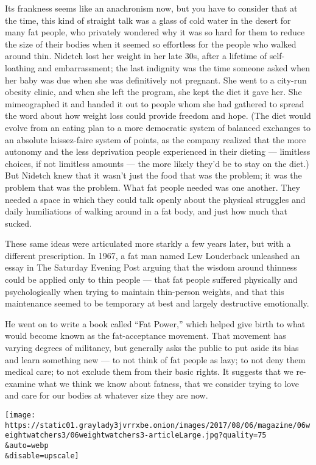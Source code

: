 Its frankness seems like an anachronism now, but you have to consider
that at the time, this kind of straight talk was a glass of cold water
in the desert for many fat people, who privately wondered why it was so
hard for them to reduce the size of their bodies when it seemed so
effortless for the people who walked around thin. Nidetch lost her
weight in her late 30s, after a lifetime of self-loathing and
embarrassment; the last indignity was the time someone asked when her
baby was due when she was definitively not pregnant. She went to a
city-run obesity clinic, and when she left the program, she kept the
diet it gave her. She mimeographed it and handed it out to people whom
she had gathered to spread the word about how weight loss could provide
freedom and hope. (The diet would evolve from an eating plan to a more
democratic system of balanced exchanges to an absolute laissez-faire
system of points, as the company realized that the more autonomy and the
less deprivation people experienced in their dieting --- limitless
choices, if not limitless amounts --- the more likely they'd be to stay
on the diet.) But Nidetch knew that it wasn't just the food that was the
problem; it was the problem that was the problem. What fat people needed
was one another. They needed a space in which they could talk openly
about the physical struggles and daily humiliations of walking around in
a fat body, and just how much that sucked.

These same ideas were articulated more starkly a few years later, but
with a different prescription. In 1967, a fat man named Lew Louderback
unleashed an essay in The Saturday Evening Post arguing that the wisdom
around thinness could be applied only to thin people --- that fat people
suffered physically and psychologically when trying to maintain
thin-person weights, and that this maintenance seemed to be temporary at
best and largely destructive emotionally.

He went on to write a book called ``Fat Power,'' which helped give birth
to what would become known as the fat-acceptance movement. That movement
has varying degrees of militancy, but generally asks the public to put
aside its bias and learn something new --- to not think of fat people as
lazy; to not deny them medical care; to not exclude them from their
basic rights. It suggests that we re-examine what we think we know about
fatness, that we consider trying to love and care for our bodies at
whatever size they are now.

\texttt{[image: https://static01.graylady3jvrrxbe.onion/images/2017/08/06/magazine/06weightwatchers3/06weightwatchers3-articleLarge.jpg?quality=75\\\&auto=webp\\\&disable=upscale]}

